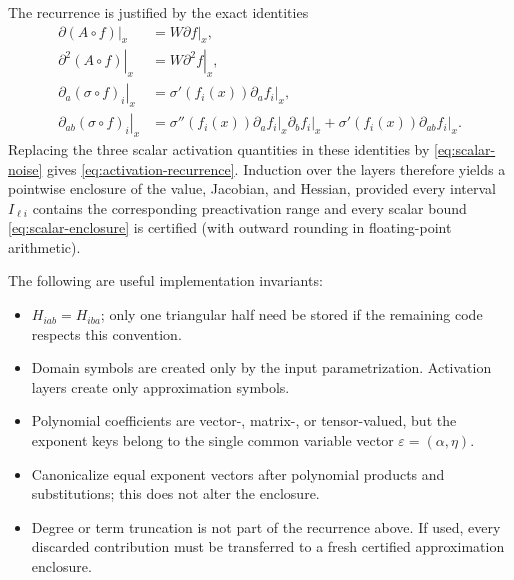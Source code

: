 \documentclass[11pt]{article}
\newcommand{\eps}{\varepsilon}
\begin{document}
The recurrence is justified by the exact identities
\begin{align}
    \left.\partial(A\circ f)\right|_x
        &=W\left.\partial f\right|_x,\\
    \left.\partial^2(A\circ f)\right|_x
        &=W\left.\partial^2 f\right|_x,\\
    \left.\partial_a(\sigma\circ f)_i\right|_x
        &=\sigma'(f_i(x))\left.\partial_a f_i\right|_x,\\
    \left.\partial_{ab}(\sigma\circ f)_i\right|_x
        &=\sigma''(f_i(x))
          \left.\partial_a f_i\right|_x
          \left.\partial_b f_i\right|_x
          +\sigma'(f_i(x))\left.\partial_{ab} f_i\right|_x.
    \label{eq:exact-identities}
\end{align}
Replacing the three scalar activation quantities in these identities by
\eqref{eq:scalar-noise} gives \eqref{eq:activation-recurrence}.  Induction over
the layers therefore yields a pointwise enclosure of the value, Jacobian, and
Hessian, provided every interval \(I_{\ell i}\) contains the corresponding
preactivation range and every scalar bound \eqref{eq:scalar-enclosure} is
certified (with outward rounding in floating-point arithmetic).

The following are useful implementation invariants:
\begin{itemize}
    \item \(H_{iab}=H_{iba}\); only one triangular half need be stored if the
          remaining code respects this convention.
    \item Domain symbols are created only by the input parametrization.
          Activation layers create only approximation symbols.
    \item Polynomial coefficients are vector-, matrix-, or tensor-valued, but
          the exponent keys belong to the single common variable vector
          \(\eps=(\alpha,\eta)\).
    \item Canonicalize equal exponent vectors after polynomial products and
          substitutions; this does not alter the enclosure.
    \item Degree or term truncation is not part of the recurrence above.  If
          used, every discarded contribution must be transferred to a fresh
          certified approximation enclosure.
\end{itemize}
\end{document}
